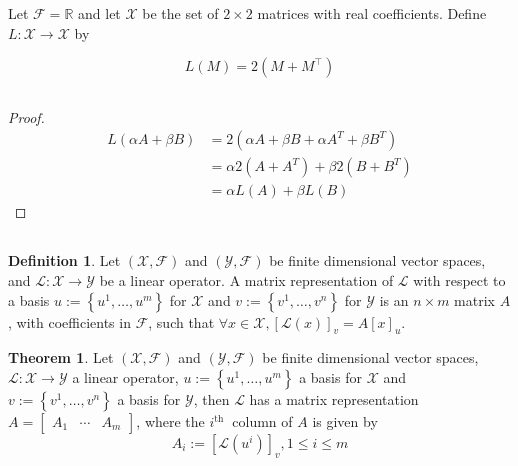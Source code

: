 \documentclass{article}
\theoremstyle{definition} %
\newtheorem{definition}{Definition}[section]
\newtheorem{theorem}{Theorem}[section]
\begin{document}
\section{}
Let $\mathcal{F}=\mathbb{R}$ and let $\mathcal{X}$ be the set of $2 \times 2$ matrices with real coefficients. Define $L: \mathcal{X} \rightarrow \mathcal{X}$ by

$$
L(M)=2\left(M+M^{\top}\right)
$$

\subsection{}
\begin{proof}
    \begin{align*}
        L(\alpha A+ \beta B) &= 2(\alpha A+ \beta B+\alpha A^T + \beta B^T)\\
        &= \alpha 2(A+A^T) + \beta 2(B+B^T)\\
        &= \alpha L(A) + \beta L(B)
    \end{align*}
\end{proof}

\subsection{}

\begin{definition}
    Let $(\mathcal{X}, \mathcal{F})$ and $(\mathcal{Y}, \mathcal{F})$ be finite dimensional vector spaces, and $\mathcal{L}: \mathcal{X} \rightarrow \mathcal{Y}$ be a linear operator. A matrix representation of $\mathcal{L}$ with respect to a basis $u:=\left\{u^1, \ldots, u^m\right\}$ for $\mathcal{X}$ and $v:=\left\{v^1, \ldots, v^n\right\}$ for $\mathcal{Y}$ is an $n \times m$ matrix $A$, with coefficients in $\mathcal{F}$, such that $\forall x \in \mathcal{X},[\mathcal{L}(x)]_v=A[x]_u$.
\end{definition}
\begin{theorem}
    Let $(\mathcal{X}, \mathcal{F})$ and $(\mathcal{Y}, \mathcal{F})$ be finite dimensional vector spaces, $\mathcal{L}: \mathcal{X} \rightarrow \mathcal{Y}$ a linear operator, $u:=\left\{u^1, \ldots, u^m\right\}$ a basis for $\mathcal{X}$ and $v:=\left\{v^1, \ldots, v^n\right\}$ a basis for $\mathcal{Y}$, then $\mathcal{L}$ has a matrix representation $A=\left[\begin{array}{lll}A_1 & \cdots & A_m\end{array}\right]$, where the $i^{\text {th }}$ column of $A$ is given by
    $$
    A_i:=\left[\mathcal{L}\left(u^i\right)\right]_v, 1 \leq i \leq m
    $$
\end{theorem}
\end{document}
